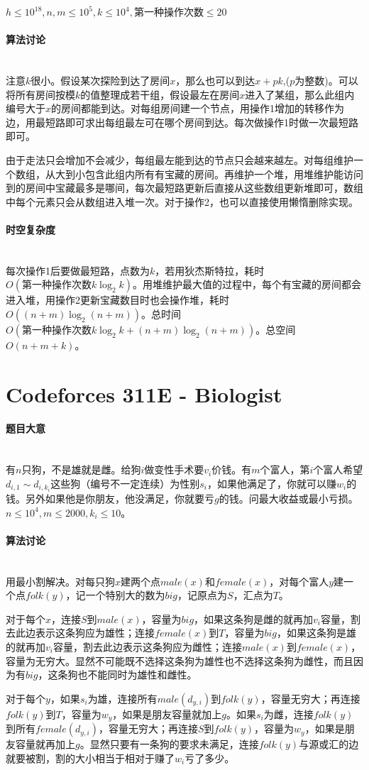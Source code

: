 \documentclass[UTF8]{ctexart}
\newcommand{\myparagraph}[1]{\paragraph{#1}\mbox{}\\}
\theoremstyle{nonumberplain}
\begin{document}
			$h \leq 10^{18}, n,m \leq 10^5, k \leq 10^4, \mbox{第一种操作次数} \leq 20$
		
		\myparagraph{算法讨论}
		
			注意$k$很小。假设某次探险到达了房间$x$，那么也可以到达$x+pk$,($p$为整数)。可以将所有房间按模$k$的值整理成若干组，假设最左在房间$x$进入了某组，那么此组内编号大于$x$的房间都能到达。对每组房间建一个节点，用操作1增加的转移作为边，用最短路即可求出每组最左可在哪个房间到达。每次做操作1时做一次最短路即可。
			
			由于走法只会增加不会减少，每组最左能到达的节点只会越来越左。对每组维护一个数组，从大到小包含此组内所有有宝藏的房间。再维护一个堆，用堆维护能访问到的房间中宝藏最多是哪间，每次最短路更新后直接从这些数组更新堆即可，数组中每个元素只会从数组进入堆一次。对于操作2，也可以直接使用懒惰删除实现。
		
		\myparagraph{时空复杂度}
		
			每次操作1后要做最短路，点数为$k$，若用狄杰斯特拉，耗时$O(\mbox{第一种操作次数}k\log_2k)$。用堆维护最大值的过程中，每个有宝藏的房间都会进入堆，用操作2更新宝藏数目时也会操作堆，耗时$O((n+m)\log_2(n+m))$。总时间$O(\mbox{第一种操作次数}k\log_2k+(n+m)\log_2(n+m))$。总空间$O(n+m+k)$。
	
	\section{Codeforces 311E - Biologist}
	
		\myparagraph{题目大意}
		
			有$n$只狗，不是雄就是雌。给狗$i$做变性手术要$v_i$价钱。有$m$个富人，第$i$个富人希望$d_{i,1} \sim d_{i,k_i}$这些狗（编号不一定连续）为性别$s_i$，如果他满足了，你就可以赚$w_i$的钱。另外如果他是你朋友，他没满足，你就要亏$g$的钱。问最大收益或最小亏损。$n \leq 10^4, m \leq 2000, k_i \leq 10$。
		
		\myparagraph{算法讨论}
		
			用最小割解决。对每只狗$x$建两个点$male(x)$和$female(x)$，对每个富人$y$建一个点$folk(y)$，记一个特别大的数为$big$，记原点为$S$，汇点为$T$。
			
			对于每个$x$，连接$S$到$male(x)$，容量为$big$，如果这条狗是雌的就再加$v_i$容量，割去此边表示这条狗应为雄性；连接$female(x)$到$T$，容量为$big$，如果这条狗是雄的就再加$v_i$容量，割去此边表示这条狗应为雌性；连接$male(x)$到$female(x)$，容量为无穷大。显然不可能既不选择这条狗为雄性也不选择这条狗为雌性，而且因为有$big$，这条狗也不能同时为雄性和雌性。
			
			对于每个$y$，如果$s_i$为雄，连接所有$male(d_{y,i})$到$folk(y)$，容量无穷大；再连接$folk(y)$到$T$，容量为$w_y$，如果是朋友容量就加上$g$。如果$s_i$为雌，连接$folk(y)$到所有$female(d_{y,i})$，容量无穷大；再连接$S$到$folk(y)$，容量为$w_y$，如果是朋友容量就再加上$g$。显然只要有一条狗的要求未满足，连接$folk(y)$与源或汇的边就要被割，割的大小相当于相对于赚了$w_i$亏了多少。
			
\end{document}
